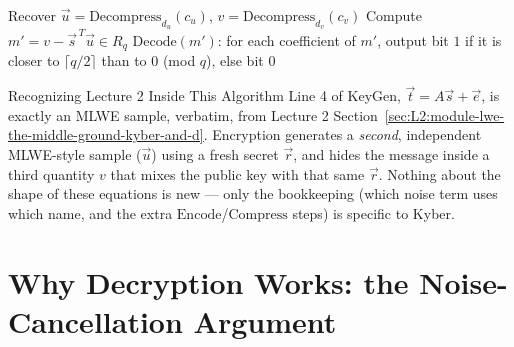 \begin{algorithm}[h]
\caption{Kyber.CPAPKE.Dec$(sk = \vec s,\ c = (c_u, c_v))$}
\begin{algorithmic}[1]
\State Recover $\vec u = \mathrm{Decompress}_{d_u}(c_u)$, $v = \mathrm{Decompress}_{d_v}(c_v)$
\State Compute $m' = v - \vec s^{\,T}\vec u \in R_q$
\State \Return $\mathrm{Decode}(m')$: for each coefficient of $m'$, output bit $1$ if it is closer to $\lceil q/2 \rceil$ than to $0$ (mod $q$), else bit $0$
\end{algorithmic}
\end{algorithm}

\begin{rmkbox}{Recognizing Lecture 2 Inside This Algorithm}
Line 4 of KeyGen, $\vec t = A\vec s + \vec e$, is exactly an MLWE sample, verbatim, from Lecture 2 Section~\ref{sec:L2:module-lwe-the-middle-ground-kyber-and-d}. Encryption generates a \emph{second}, independent MLWE-style sample ($\vec u$) using a fresh secret $\vec r$, and hides the message inside a third quantity $v$ that mixes the public key with that same $\vec r$. Nothing about the shape of these equations is new --- only the bookkeeping (which noise term uses which name, and the extra $\mathrm{Encode}$/$\mathrm{Compress}$ steps) is specific to Kyber.
\end{rmkbox}

\section{Why Decryption Works: the Noise-Cancellation Argument}
\label{sec:L3:why-decryption-works-the-noise-cancellat}

